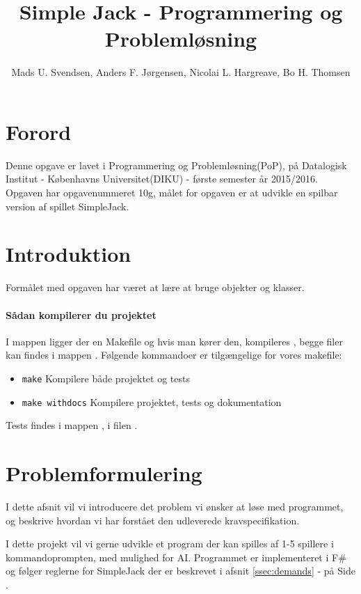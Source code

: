 \documentclass[a4paper]{article}
\title{Simple Jack - Programmering og Problemløsning}
\author{Mads U. Svendsen, Anders F. Jørgensen, Nicolai L. Hargreave, Bo H. Thomsen}
\newcommand{\namedref}[1]{\autoref{#1} - \nameref{#1} på Side \pageref{#1}}
\begin{document}
	\maketitle %
        
  \tableofcontents

\section{Forord}
  Denne opgave er lavet i Programmering og Problemløsning(PoP),
    på Datalogisk Institut - Københavns Universitet(DIKU) - første semester år 2015/2016.
    Opgaven har opgavenummeret 10g, målet for opgaven er at
    udvikle en spilbar version af spillet SimpleJack.

\newpage
    
\section{Introduktion} \label{sec:introduction}
   Formålet med opgaven har været at lære at bruge objekter og klasser.

  \paragraph*{Sådan kompilerer du projektet\\}
    I  mappen ligger der en Makefile og hvis man kører den, 
    kompileres ,
    begge filer kan findes i mappen .
    Følgende kommandoer er tilgængelige for vores makefile:
    \begin{itemize}
      \item \lstinline$make$ Kompilere både projektet og tests
      \item \lstinline$make withdocs$ Kompilere projektet, tests og dokumentation
    \end{itemize}

    Tests findes i  mappen , i filen .

\section{Problemformulering} \label{sec:problem}
  I dette afsnit vil vi introducere det problem vi ønsker at løse med programmet,
  og beskrive hvordan vi har forstået den udleverede kravspecifikation.

  I dette projekt vil vi gerne udvikle et program der kan spilles af 1-5 spillere i kommandoprompten,
  med mulighed for AI. Programmet er implementeret i F\# og følger reglerne for SimpleJack der er beskrevet i afsnit \namedref{ssec:demands}.
\end{document}
